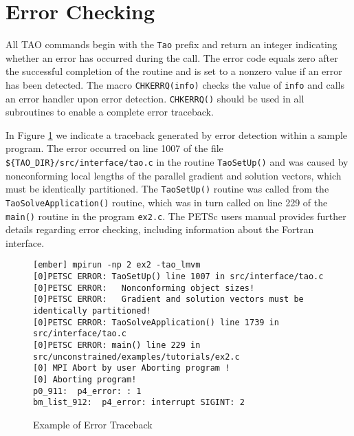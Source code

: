 \begin{comment}
\begin{figure}[htb]
{\footnotesize
\begin{verbatim}
[ember] ex2 -tao_method tao_nls -tao_monitor
iter = 0, Function value: -0.330579, Residual: 0.728961
iter = 1, Function value: -0.427745, Residual: 3.64242e-07
iter = 2, Function value: -0.427745, Residual: 2.03244e-12

[ember] mpirun -np 2 ex2 -tao_method tao_nls -tao_monitor
iter = 0, Function value: -0.330579, Residual: 0.728961
iter = 1, Function value: -0.427745, Residual: 3.63647e-07
iter = 2, Function value: -0.427745, Residual: 2.18415e-12

\end{verbatim}
}
\nobreak
\caption{Running a TAO Program}
\label{fig:exrun}
\end{figure}
  
\end{comment}


\section{Error Checking}

All TAO commands begin with the \texttt{Tao} prefix and return an
integer indicating whether an error has occurred during the call.  The
error code equals zero after the successful completion of the routine
and is set to a nonzero value if an error has been detected.  The
macro \texttt{CHKERRQ(info)} checks the value of \texttt{info} and calls an
error handler upon error detection.  \texttt{CHKERRQ()} should be used in
all subroutines to enable a complete error traceback.

In Figure \ref{fig:traceback} we indicate a traceback generated by
error detection within a sample program. The error occurred on line
1007 of the file \texttt{\$\{TAO\_DIR\}/src/interface/tao.c} in the
routine \texttt{TaoSetUp()} and was caused by nonconforming local lengths
of the parallel gradient and solution vectors, which must be
identically partitioned.  The \texttt{TaoSetUp()} routine was called from
the \texttt{TaoSolveApplication()} routine, which was in turn called on line 229 of
the \texttt{main()} routine in the program \texttt{ex2.c}.  The PETSc users
manual provides further details regarding error checking, including
information about the Fortran interface.

\begin{figure}[htb]
{\footnotesize
\begin{verbatim}
[ember] mpirun -np 2 ex2 -tao_lmvm
[0]PETSC ERROR: TaoSetUp() line 1007 in src/interface/tao.c
[0]PETSC ERROR:   Nonconforming object sizes!
[0]PETSC ERROR:   Gradient and solution vectors must be identically partitioned!
[0]PETSC ERROR: TaoSolveApplication() line 1739 in src/interface/tao.c
[0]PETSC ERROR: main() line 229 in src/unconstrained/examples/tutorials/ex2.c
[0] MPI Abort by user Aborting program !
[0] Aborting program!
p0_911:  p4_error: : 1
bm_list_912:  p4_error: interrupt SIGINT: 2
\end{verbatim}
}
\caption{Example of Error Traceback}
\label{fig:traceback}
\end{figure}


